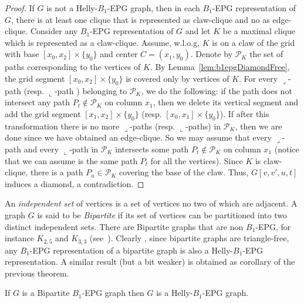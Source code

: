 \documentclass{dmgt}
\begin{document}
\begin{proof}
If $G$ is not a Helly-$B_1$-EPG graph, then in each $B_1$-EPG representation of $G$, there is at least one clique that is represented as claw-clique and no as edge-clique.  Consider any $B_1$-EPG  representation of $G$  and let $K$ be a maximal clique  which is represented as a claw-clique. Assume, w.l.o.g,  $K$ is on a claw of the grid with base $[x_0, x_2]\times\{y_0\}$ and center $C = (x_1, y_0)$. Denote by  $\mathcal{P}_K$ the set of paths corresponding to the vertices of $K$. 
 By Lemma~\ref{lem:b1epgDiamondFree},  %
the grid segment $[x_0, x_2]\times\{y_0\}$ is covered only by vertices of $K$. %
 For every ${\displaystyle \lrcorner}$-path %
 (resp. ${\displaystyle \llcorner}$-path 
 ) belonging to $\mathcal{P}_K$, we do the following: if %
 the path does not intersect any path $P_t \notin\mathcal{P}_K$ on column $x_1$, then we delete its vertical segment and add the grid segment $[x_1, x_2]\times\{y_0\}$ (resp. $[x_0, x_1]\times\{y_0\}$). If after this transformation there is no more ${\displaystyle \lrcorner}$-paths (resp. ${\displaystyle \llcorner}$-paths) in $\mathcal{P}_K$, then we are done since we have obtained an edge-clique. So we may assume that
 every ${\displaystyle \lrcorner}$-path   and every ${\displaystyle \llcorner}$-path  in $ \mathcal{P}_K$ intersects some path $P_t \notin \mathcal{P}_K$   on column $x_1$ (notice that we can assume is the same path $P_t$ for all the vertices). Since  $K$ is claw-clique,  there is a path $P_u \in \mathcal{P}_K$ covering the base of the claw. Thus, $G[v, v', u, t]$ induces a diamond,  a contradiction. 
\end{proof}  

An \textit{independent set} of vertices is a set of vertices no two of which are adjacent.
A graph $G$ is said to be \textit{Bipartite} if its set of vertices can be partitioned into two distinct independent sets.
 There are Bipartite graphs that are non $B_1$-EPG, for instance $K_{2,5}$ and $K_{3,3}$ (see~\cite{cohen2014}). Clearly , since
 bipartite graphs are triangle-free, any $B_1$-EPG representation of a bipartite graph is also a Helly-$B_1$-EPG representation.
 A similar result (but a bit weaker) is obtained as corollary of the previous theorem. 


\begin{cor}
If $G$ is a Bipartite $B_1$-EPG graph then $G$ is a Helly-$B_1$-EPG graph.
\end{cor}
\end{document}

